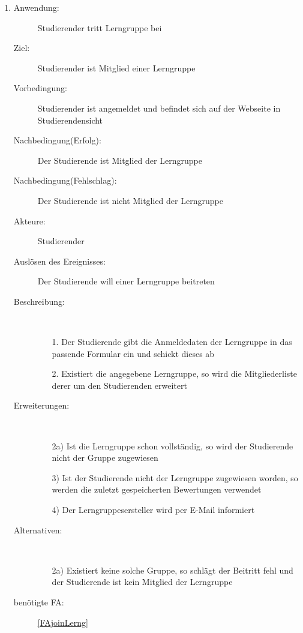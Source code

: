 \documentclass[parskip=full]{scrartcl}
\newcommand{\swtLabel}[1]{\textbf{/#1\arabic*0/}}
\begin{document}
\begin{enumerate}[label=\swtLabel{S}]
  
  \item \label{UCstudJoinLernG}
  \begin{description}
  \item[Anwendung:] Studierender tritt \gls{Lerngruppe} bei
  \item[Ziel:] Studierender ist Mitglied einer \gls{Lerngruppe}
  	\item[Vorbedingung:] Studierender ist angemeldet und befindet sich auf der
  	Webseite in Studierendensicht
  	\item[Nachbedingung(Erfolg):] Der Studierende ist Mitglied der
  	\gls{Lerngruppe}
  	\item[Nachbedingung(Fehlschlag):] Der Studierende ist nicht Mitglied der
  	\gls{Lerngruppe}
  	\item[Akteure:] Studierender
  	\item[Auslösen des Ereignisses:] Der Studierende will einer \gls{Lerngruppe}
  	beitreten
  	\item[Beschreibung:]~
  	\begin{enumerate}
  	  \item[1.] Der Studierende gibt die Anmeldedaten der \gls{Lerngruppe} in das
  	  passende Formular ein und schickt dieses ab %
  	  \item[2.] Existiert die angegebene \gls{Lerngruppe}, so wird die
  	  Mitgliederliste derer um den Studierenden erweitert
  	\end{enumerate}
  	\item[Erweiterungen:]~
  	\begin{enumerate}
  	  \item[2a)] Ist die \gls{Lerngruppe} schon vollständig, so wird der
  	  Studierende nicht der Gruppe zugewiesen
  	  \item[3)] Ist der Studierende nicht der \gls{Lerngruppe} zugewiesen worden,
  	  so werden die zuletzt gespeicherten Bewertungen verwendet
  	  \item[4)] Der \glspl{Lerngruppe}ersteller wird per E-Mail informiert
  	 \end{enumerate}
  	\item[Alternativen:] ~
  	\begin{enumerate}
  	  \item[2a)] Existiert keine solche Gruppe, so schlägt der Beitritt fehl und
  	  der Studierende ist kein Mitglied der \gls{Lerngruppe}
  	 \end{enumerate}
  	 \item[benötigte FA:] \ref{FAjoinLerng}
  \end{description}
  

\end{enumerate}
\end{document}
